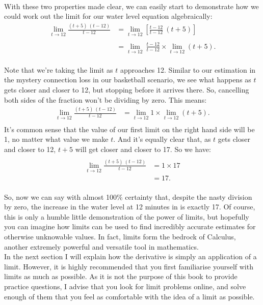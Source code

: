 \documentclass[11pt]{article}
\numberwithin{equation}{section}
\begin{document}
\\ With these two properties made clear, we can easily start to demonstrate how we could work out the limit for our water level equation algebraically:
\begin{align*}
\lim_{t \to 12} \frac{(t + 5) \ (t - 12)}{t - 12} &= \lim_{t \to 12} \left[ \frac{t - 12}{t - 12} \ (t + 5) \right] \\ \\
 &= \lim_{t \to 12} \ \frac{t - 12}{t - 12} \times \lim_{t \to 12} (t + 5).
\end{align*}
\\ Note that we're taking the limit as \(t\) approaches 12. Similar to our estimation in the mystery connection loss in our basketball scenario, we see what happens as \(t\) gets closer and closer to 12, but stopping before it arrives there. So, cancelling both sides of the fraction won't be dividing by zero. This means:
\begin{align*}
\lim_{t \to 12} \frac{(t + 5) \ (t - 12)}{t - 12} &= \lim_{t \to 12} 1 \times \lim_{t \to 12} \left( t + 5 \right). \\
\end{align*}
It's common sense that the value of our first limit on the right hand side will be 1, no matter what value we make \(t\). And it's equally clear that, as \(t\) gets closer and closer to 12, \(t + 5\) will get closer and closer to 17. So we have:
\begin{align*}
\\
\lim_{t \to 12} \frac{(t + 5) \ (t - 12)}{t - 12} &= 1 \times 17 \\
&= 17.
\end{align*}
\\ So, now we can say with almost 100\% certainty that, despite the nasty division by zero, the increase in the water level at 12 minutes in is exactly 17. Of course, this is only a humble little demonstration of the power of limits, but hopefully you can imagine how limits can be used to find incredibly accurate estimates for otherwise unknowable values. In fact, limits form the bedrock of Calculus, another extremely powerful and versatile tool in mathematics. 
\\ In the next section I will explain how the derivative is simply an application of a limit. However, it is highly recommended that you first familiarise yourself with limits as much as possible. As it is not the purpose of this book to provide practice questions, I advise that you look for limit problems online, and solve enough of them that you feel as comfortable with the idea of a limit as possible. 
\end{document}
